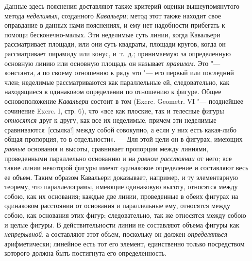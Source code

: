 {Данные здесь пояснения доставляют также критерий оценки вышеупомянутого
метода {\em неделимых}, созданного
{\em Кавальери}; метод этот также находит свое
оправдание в данных нами пояснениях, и ему нет надобности прибегать к
помощи бесконечно-малых. Эти неделимые суть линии, когда Кавальери
рассматривает площади, или они суть квадраты, площади кругов, когда он
рассматривает пирамиду или конус, и~т.~д.; принимаемую за определенную
основную линию или основную площадь он называет
{\em правилом}. Это "--- константа, а по своему отношению
к ряду это "--- его первый или последний член; неделимые рассматриваются как
параллельные ей, следовательно, как находящиеся в одинаковом определении по
отношению к фигуре. Общее основоположение
{\em Кавальери} состоит в том (Exerc. Geometr. VI
"--- позднейшее сочинение Exerc. I, стр. 6), что «все как плоские, так и
телесные фигуры {\em относятся} друг к другу, как все
их неделимые, причем эти неделимые
сравниваются~[ссылка!] между собой совокупно, а если у них есть
какая-либо общая пропорция, то в отдельности». — Для этой цели он в
фигурах, имеющих {\em равные} основания и высоты,
сравнивает пропорции между линиями, проведенными параллельно основанию и на
{\em равном расстоянии} от него; все такие линии
некоторой фигуры имеют одинаковое определение и составляют весь ее объем.
Таким образом Кавальери доказывает, например, и ту элементарную теорему,
что параллелограмы, имеющие одинаковую высоту, относятся между собою, как
их основания; каждые две линии, проведенные в обеих фигурах на одинаковом
расстоянии от основания и параллельные ему, относятся между собою, как
основания этих фигур; следовательно, так же относятся между собою и целые
фигуры. В действительности линии не составляют объема фигуры как
{\em непрерывной}, а составляют этот объем, поскольку
он должен {\em определяться} арифметически; линейное
есть тот его элемент, единственно только посредством которого должна быть
постигнута его определенность.

}

